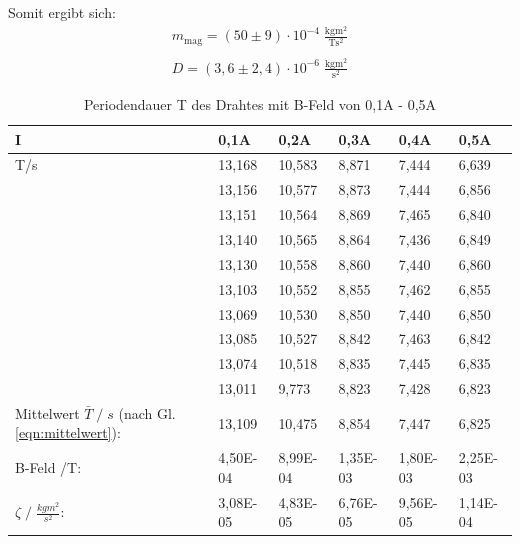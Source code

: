 Somit ergibt sich:
\begin{gather*}
    m_\text{mag} = (50 \pm 9) \cdot 10^{-4} \;\mathrm{\frac{kgm^2}{Ts^2}}\\\\
    D = (3,6 \pm 2,4) \cdot 10^{-6} \;\mathrm{\frac{kgm^2}{s^2}}
\end{gather*}

\newpage
\begin{table}
    \caption{Periodendauer T des Drahtes mit B-Feld von 0,1A - 0,5A}
    \centering
    \begin{tabular}{p{3cm} | p{1.5cm} p{1.5cm} p{1.5cm} p{1.5cm} p{1.5cm}}
    I & 0,1A & 0,2A & 0,3A & 0,4A & 0,5A\\
    \midrule
    T\;/\;s & 13,168 & 10,583 & 8,871 &  7,444 &  6,639\\   
    & 13,156 & 10,577 & 8,873 &  7,444 &  6,856\\   
    & 13,151 & 10,564 & 8,869 &  7,465 &  6,840\\   
    & 13,140 & 10,565 & 8,864 &  7,436 &  6,849\\   
    & 13,130 & 10,558 & 8,860 &  7,440 &  6,860\\   
    & 13,103 & 10,552 & 8,855 &  7,462 &  6,855\\   
    & 13,069 & 10,530 & 8,850 &  7,440 &  6,850\\   
    & 13,085 & 10,527 & 8,842 &  7,463 &  6,842\\   
    & 13,074 & 10,518 & 8,835 &  7,445 &  6,835\\   
    & 13,011 &  9,773 & 8,823 &  7,428 &  6,823\\ 
    \midrule
    Mittelwert $\bar{T}\;/\;s$ (nach Gl. \ref{eqn:mittelwert}):    & 13,109 & 10,475 & 8,854 & 7,447 & 6,825 \\
    \midrule
    B-Feld \;/\;T: & 4,50E-04 & 8,99E-04 & 1,35E-03 & 1,80E-03 & 2,25E-03\\
    $\zeta\;/\;\frac{kgm^2}{s^2}$: & 3,08E-05 & 4,83E-05 & 6,76E-05 & 9,56E-05 & 1,14E-04\\
    \bottomrule
    \end{tabular}
    \label{tab:tabelle_01A}
\end{table}



